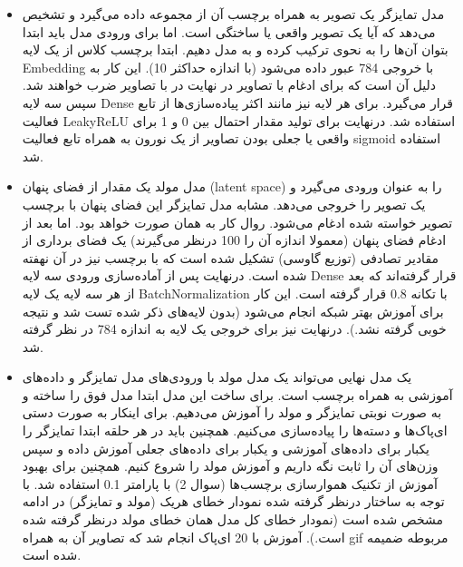 \documentclass{article}
\begin{document}
\begin{itemize}
    \item مدل تمایزگر یک تصویر به همراه برچسب آن از مجموعه داده می‌گیرد و تشخیص می‌دهد که آیا یک تصویر واقعی یا ساختگی است. اما برای ورودی مدل باید ابتدا بتوان آن‌ها را به نحوی ترکیب کرده و به مدل دهیم. ابتدا برچسب کلاس از یک لایه Embedding با خروجی 784 عبور داده می‌شود (با اندازه حداکثر 10). این کار به دلیل آن است که برای ادغام با تصاویر در نهایت در با تصاویر ضرب خواهند شد. سپس سه لایه Dense قرار می‌گیرد. برای هر لایه نیز مانند اکثر پیاده‌سازی‌ها از تابع فعالیت LeakyReLU استفاده شد. درنهایت برای تولید مقدار احتمال بین 0 و 1 برای واقعی یا جعلی بودن تصاویر از یک نورون به همراه تابع فعالیت sigmoid استفاده شد.
    \item مدل مولد یک مقدار از فضای پنهان (latent space) را به عنوان ورودی می‌گیرد و یک تصویر را خروجی می‌دهد. مشابه مدل تمایزگر این فضای پنهان با برچسب تصویر خواسته شده ادغام می‌شود. روال کار به همان صورت خواهد بود. اما بعد از ادغام فضای پنهان (معمولا اندازه آن را 100 درنظر می‌گیرند) یک فضای برداری از مقادیر تصادفی (توزیع گاوسی) تشکیل شده است که با برچسب نیز در آن نهفته شده است. درنهایت پس از آماده‌سازی ورودی سه لایه Dense قرار گرفته‌اند که بعد از هر سه لایه یک لایه BatchNormalization با تکانه 0.8 قرار گرفته است. این کار برای آموزش بهتر شبکه انجام می‌شود (بدون لایه‌های ذکر شده تست شد و نتیجه خوبی گرفته نشد.). درنهایت نیز برای خروجی یک لایه به اندازه 784 در نظر گرفته شد. 
    \item یک مدل نهایی می‌تواند یک مدل مولد با ورودی‌های مدل تمایزگر و داده‌های آموزشی به همراه برچسب است. برای ساخت این مدل ابتدا مدل فوق را ساخته و به صورت نوبتی تمایزگر و مولد را آموزش می‌دهیم. برای اینکار به صورت دستی ای‌پاک‌ها و دسته‌ها را پیاده‌سازی می‌کنیم. همچنین باید در هر حلقه ابتدا تمایزگر را یکبار برای داده‌های آموزشی و یکبار برای داده‌های جعلی آموزش داده و سپس وزن‌های آن را ثابت نگه داریم و آموزش مولد را شروع کنیم. همچنین برای بهبود آموزش از تکنیک هموارسازی برچسب‌‌ها (سوال 2) با پارامتر 0.1 استفاده شد. با توجه به ساختار درنظر گرفته شده نمودار خطای هریک (مولد و تمایزگر) در ادامه مشخص شده است (نمودار خطای کل مدل همان خطای مولد درنظر گرفته شده است.). آموزش با 20 ای‌پاک انجام شد که تصاویر آن به همراه gif مربوطه ضمیمه شده است. 
\end{itemize}
\end{document}
